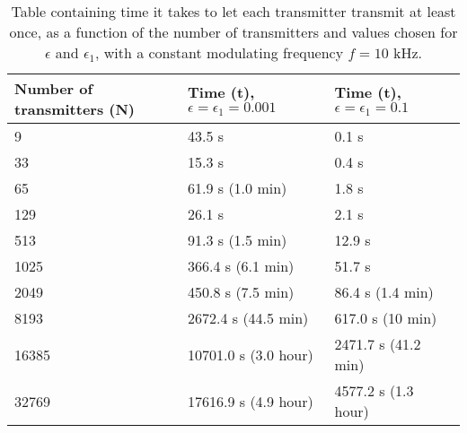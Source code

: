 \begin{table}[t]
	\centering
	\begin{tabular}{  | l | l | l | }

		\hline
		Number of transmitters (N)	& Time (t), $\epsilon = \epsilon_1 = 0.001$	& Time (t), $\epsilon = \epsilon_1 = 0.1$		\\ \hline

		9							& 43.5 s 									& 0.1 s 										\\ \hline
		33							& 15.3 s									& 0.4 s 										\\ \hline
		65							& 61.9 s (1.0 min)							& 1.8 s 										\\ \hline
		129							& 26.1 s 									& 2.1 s  										\\ \hline
		513							& 91.3 s (1.5 min)							& 12.9 s 										\\ \hline
		1025						& 366.4 s (6.1 min)							& 51.7 s 										\\ \hline
		2049						& 450.8 s (7.5 min)							& 86.4 s (1.4 min)								\\ \hline
		8193						& 2672.4 s (44.5 min)						& 617.0 s (10 min)								\\ \hline
		16385						& 10701.0 s	(3.0 hour)						& 2471.7 s (41.2 min)							\\ \hline
		32769						& 17616.9 s	(4.9 hour)						& 4577.2 s	(1.3 hour)							\\ \hline


	\end{tabular}
	\caption{Table containing time it takes to let each transmitter transmit at least once, as a function of the number of transmitters and values chosen for $\epsilon$ and $\epsilon_1$, with a constant modulating frequency $f = 10$ kHz. }
	\label{tbl:probabilistic-method-time-as-function-N}

\end{table}




